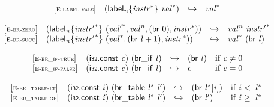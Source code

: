 \vspace{1ex}

$$
\begin{array}{@{}l@{}lcl@{}l@{}}
{[\textsc{\scriptsize E{-}label{-}vals}]} \quad & ({{\mathsf{label}}_{{\mathit{n}}}}{\{{{\mathit{instr}}^\ast}\}}~{{\mathit{val}}^\ast}) &\hookrightarrow& {{\mathit{val}}^\ast} &  \\
\end{array}
$$

\vspace{1ex}

$$
\begin{array}{@{}l@{}lcl@{}l@{}}
{[\textsc{\scriptsize E{-}br{-}zero}]} \quad & ({{\mathsf{label}}_{{\mathit{n}}}}{\{{{\mathit{instr}'}^\ast}\}}~({{\mathit{val}'}^\ast}, {{\mathit{val}}^{{\mathit{n}}}}, (\mathsf{br}~0), {{\mathit{instr}}^\ast})) &\hookrightarrow& {{\mathit{val}}^{{\mathit{n}}}}~{{\mathit{instr}'}^\ast} &  \\
{[\textsc{\scriptsize E{-}br{-}succ}]} \quad & ({{\mathsf{label}}_{{\mathit{n}}}}{\{{{\mathit{instr}'}^\ast}\}}~({{\mathit{val}}^\ast}, (\mathsf{br}~{\mathit{l}} + 1), {{\mathit{instr}}^\ast})) &\hookrightarrow& {{\mathit{val}}^\ast}~(\mathsf{br}~{\mathit{l}}) &  \\
\end{array}
$$

\vspace{1ex}

$$
\begin{array}{@{}l@{}lcl@{}l@{}}
{[\textsc{\scriptsize E{-}br\_if{-}true}]} \quad & (\mathsf{i{\scriptstyle32}}.\mathsf{const}~{\mathit{c}})~(\mathsf{br\_if}~{\mathit{l}}) &\hookrightarrow& (\mathsf{br}~{\mathit{l}}) &\quad
  \mbox{if}~{\mathit{c}} \neq 0 \\
{[\textsc{\scriptsize E{-}br\_if{-}false}]} \quad & (\mathsf{i{\scriptstyle32}}.\mathsf{const}~{\mathit{c}})~(\mathsf{br\_if}~{\mathit{l}}) &\hookrightarrow& \epsilon &\quad
  \mbox{if}~{\mathit{c}} = 0 \\
\end{array}
$$

\vspace{1ex}

$$
\begin{array}{@{}l@{}lcl@{}l@{}}
{[\textsc{\scriptsize E{-}br\_table{-}lt}]} \quad & (\mathsf{i{\scriptstyle32}}.\mathsf{const}~{\mathit{i}})~(\mathsf{br\_table}~{{\mathit{l}}^\ast}~{\mathit{l}'}) &\hookrightarrow& (\mathsf{br}~{{\mathit{l}}^\ast}{}[{\mathit{i}}]) &\quad
  \mbox{if}~{\mathit{i}} < {|{{\mathit{l}}^\ast}|} \\
{[\textsc{\scriptsize E{-}br\_table{-}ge}]} \quad & (\mathsf{i{\scriptstyle32}}.\mathsf{const}~{\mathit{i}})~(\mathsf{br\_table}~{{\mathit{l}}^\ast}~{\mathit{l}'}) &\hookrightarrow& (\mathsf{br}~{\mathit{l}'}) &\quad
  \mbox{if}~{\mathit{i}} \geq {|{{\mathit{l}}^\ast}|} \\
\end{array}
$$

